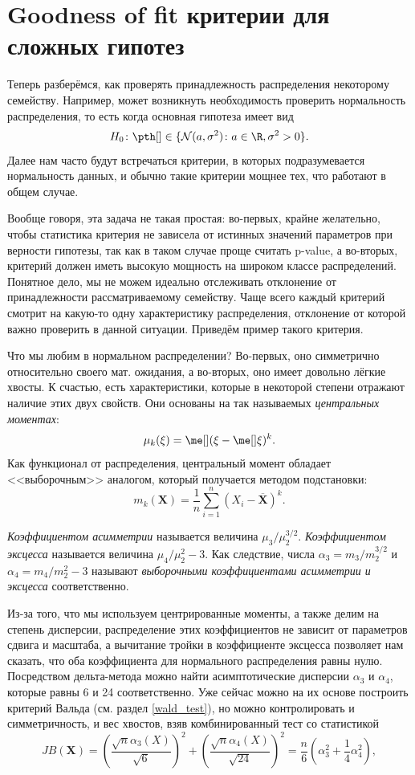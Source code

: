 \section{Goodness of fit критерии для сложных гипотез}\label{special_test}

Теперь разберёмся, как проверять принадлежность распределения некоторому семейству. Например, может возникнуть необходимость проверить нормальность распределения, то есть когда основная гипотеза имеет вид $$H_0\colon \pth[] \in\{\mathcal{N}(a, \sigma^2)\colon a\in\R, \sigma^2 > 0\}.$$
Далее нам часто будут встречаться критерии, в которых подразумевается нормальность данных, и обычно такие критерии мощнее тех, что работают в общем случае.

Вообще говоря, эта задача не такая простая: во-первых, крайне желательно, чтобы статистика критерия не зависела от истинных значений параметров при верности гипотезы, так как в таком случае проще считать p-value, а во-вторых, критерий должен иметь высокую мощность на широком классе распределений. Понятное дело, мы не можем идеально отслеживать отклонение от принадлежности рассматриваемому семейству. Чаще всего каждый критерий смотрит на какую-то одну характеристику распределения, отклонение от которой важно проверить в данной ситуации. Приведём пример такого критерия.

Что мы любим в нормальном распределении? Во-первых, оно симметрично относительно своего мат. ожидания, а во-вторых, оно имеет довольно лёгкие хвосты. К счастью, есть характеристики, которые в некоторой степени отражают наличие этих двух свойств. Они основаны на так называемых \textit{центральных моментах}:
\[
\mu_k(\xi) = \me[](\xi - \me[]\xi)^k.
\]
Как функционал от распределения, центральный момент обладает <<выборочным>> аналогом, который получается методом подстановки:
\[
m_k(\mathbf X) = \frac{1}{n} \sum_{i=1}^n \left(X_i - \overline{\mathbf X}\right)^k.
\]
\begin{definition}
    \textit{Коэффициентом асимметрии} называется величина $\mu_3 / \mu_2^{3/2}$. \textit{Коэффициентом эксцесса} называется величина $\mu_4 / \mu_2^{2} - 3$. Как следствие, числа $\alpha_3 = m_3 / m_2^{3/2}$ и $\alpha_4 = m_4 / m_2^2 - 3$ называют \textit{выборочными коэффициентами асимметрии и эксцесса} соответственно.
\end{definition}
Из-за того, что мы используем центрированные моменты, а также делим на степень дисперсии, распределение этих коэффициентов не зависит от параметров сдвига и масштаба, а вычитание тройки в коэффициенте эксцесса позволяет нам сказать, что оба коэффициента для нормального распределения равны нулю. Посредством дельта-метода можно найти асимптотические дисперсии $\alpha_3$ и $\alpha_4$, которые равны 6 и 24 соответственно. Уже сейчас можно на их основе построить критерий Вальда (см. раздел \ref{wald_test}), но можно контролировать и симметричность, и вес хвостов, взяв комбинированный тест со статистикой
\[
JB(\mathbf X) = \left(\frac{\sqrt{n}\alpha_3(X)}{\sqrt{6}}\right)^2 + \left(\frac{\sqrt{n}\alpha_4(X)}{\sqrt{24}}\right)^2 = \frac{n}{6}\left(\alpha_3^2 + \frac{1}{4}\alpha_4^2\right),
\]

